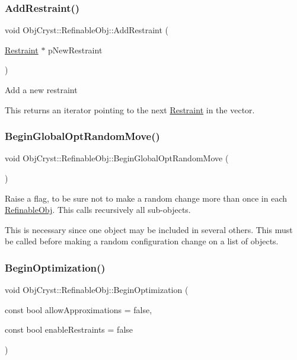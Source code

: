 \subsubsection{\texorpdfstring{AddRestraint()}{AddRestraint()}}
{\footnotesize\ttfamily void Obj\+Cryst\+::\+Refinable\+Obj\+::\+Add\+Restraint (\begin{DoxyParamCaption}\item[{\mbox{\hyperlink{class_obj_cryst_1_1_restraint}{Restraint}} $\ast$}]{p\+New\+Restraint }\end{DoxyParamCaption})}

Add a new restraint

This returns an iterator pointing to the next \mbox{\hyperlink{class_obj_cryst_1_1_restraint}{Restraint}} in the vector. \mbox{\label{class_obj_cryst_1_1_refinable_obj_a47fc5a85493671a3590ed7e3971b18fe}} 
\subsubsection{\texorpdfstring{BeginGlobalOptRandomMove()}{BeginGlobalOptRandomMove()}}
{\footnotesize\ttfamily void Obj\+Cryst\+::\+Refinable\+Obj\+::\+Begin\+Global\+Opt\+Random\+Move (\begin{DoxyParamCaption}{ }\end{DoxyParamCaption})}

Raise a flag, to be sure not to make a random change more than once in each \mbox{\hyperlink{class_obj_cryst_1_1_refinable_obj}{Refinable\+Obj}}. This calls recursively all sub-\/objects.

This is necessary since one object may be included in several others. This must be called before making a random configuration change on a list of objects. \mbox{\label{class_obj_cryst_1_1_refinable_obj_a55da6256532023f40769c79eef074703}} 
\subsubsection{\texorpdfstring{BeginOptimization()}{BeginOptimization()}}
{\footnotesize\ttfamily void Obj\+Cryst\+::\+Refinable\+Obj\+::\+Begin\+Optimization (\begin{DoxyParamCaption}\item[{const bool}]{allow\+Approximations = {\ttfamily false},  }\item[{const bool}]{enable\+Restraints = {\ttfamily false} }\end{DoxyParamCaption})\hspace{0.3cm}{\ttfamily [virtual]}}

